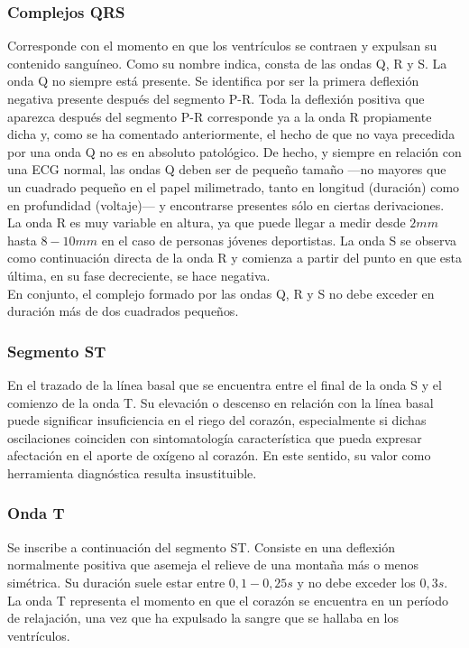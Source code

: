\documentclass[12pt,letterpaper,oneside,openright]{book}
\begin{document}
\subsubsection{Complejos QRS}

Corresponde con el momento en que los ventrículos se contraen y expulsan su contenido sanguíneo. Como su nombre indica, consta de las ondas Q, R y S. La onda Q no siempre está presente. Se identifica por ser la primera deflexión negativa presente después del segmento P-R. Toda la deflexión positiva que aparezca después del segmento P-R corresponde ya a la onda R propiamente dicha y, como se ha comentado anteriormente, el hecho de que no vaya precedida por una onda Q no es en absoluto patológico. De hecho, y siempre en relación con una ECG normal, las ondas Q deben ser de pequeño tamaño ---no mayores que un cuadrado pequeño en el papel milimetrado, tanto en longitud (duración) como en profundidad (voltaje)--- y encontrarse presentes sólo en ciertas derivaciones. La onda R es muy variable en altura, ya que puede llegar a medir desde $2 mm$ hasta $8-10 mm$ en el caso de personas jóvenes deportistas. La onda S se observa como continuación directa de la onda R y comienza a partir del punto en que esta última, en su fase decreciente, se hace negativa.\\
En conjunto, el complejo formado por las ondas Q, R y S no debe exceder en duración más de dos cuadrados pequeños. 

\subsubsection{Segmento ST}

En el trazado de la línea basal que se encuentra entre el final de la onda S y el comienzo de la onda T. Su elevación o descenso en relación con la línea basal puede significar insuficiencia en el riego del corazón, especialmente si dichas oscilaciones coinciden con sintomatología característica que pueda expresar afectación en el aporte de oxígeno al corazón. En este sentido, su valor como herramienta diagnóstica resulta insustituible.

\subsubsection{Onda T}

Se inscribe a continuación del segmento ST. Consiste en una deflexión normalmente positiva que asemeja el relieve de una montaña más o menos simétrica. Su duración suele estar entre $0,1-0,25 s$ y no debe exceder los $0,3 s$. La onda T representa el momento en que el corazón se encuentra en un período de relajación, una vez que ha expulsado la sangre que se hallaba en los ventrículos.
\end{document}
